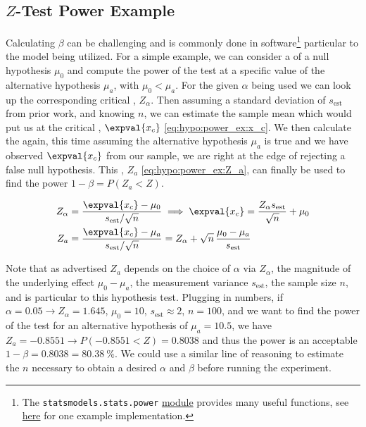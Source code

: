 \subsection{\texorpdfstring{$Z$}{Z}-Test Power Example}
\label{hypo:power:Z_example}

Calculating $\beta$ can be challenging and is commonly done in software\footnote{The \texttt{statsmodels.stats.power}
\href{https://www.statsmodels.org/stable/stats.html\#power-and-sample-size-calculations}{module}
provides many useful functions, see \href{https://machinelearningmastery.com/statistical-power-and-power-analysis-in-python/}{here} for one example implementation.} particular to the model being utilized.
For a simple example, we can consider a \Ztest of a null hypothesis $\mu_{0}$
and compute the power of the test at a specific value of the alternative hypothesis $\mu_{a}$, with $\mu_{0} < \mu_{a}$.
For the given $\alpha$ being used we can look up the corresponding critical \Zscore, $Z_{\alpha}$.
Then assuming a standard deviation of $s_{\text{est}}$ from prior work,
and knowing $n$, we can estimate the sample mean
which would put us at the critical \Zscore, $\expval{x_{c}}$ \cref{eq:hypo:power_ex:x_c}.
We then calculate the \Zscore again, this time assuming the alternative hypothesis $\mu_{a}$ is true
and we have observed $\expval{x_{c}}$ from our sample, \ie we are right at the edge of rejecting a false null hypothesis.
This \Zscore, $Z_{a}$ \cref{eq:hypo:power_ex:Z_a}, can finally be used to find the power $1-\beta = P\left(Z_{a} < Z\right)$.

\begin{subequations}\label{eq:hypo:power_ex}
\begin{align}
Z_{\alpha} &= \frac{\expval{x_{c}} - \mu_{0}}{s_{\text{est}} / \sqrt{n}} \implies
\expval{x_{c}} = \frac{Z_{\alpha} s_{\text{est}}}{\sqrt{n}} + \mu_{0} \label{eq:hypo:power_ex:x_c} \\
Z_{a} &= \frac{\expval{x_{c}} - \mu_{a}}{s_{\text{est}} / \sqrt{n}}
= Z_{\alpha} + \sqrt{n}\,\frac{\mu_{0} - \mu_{a}}{s_{\text{est}}} \label{eq:hypo:power_ex:Z_a}
\end{align}
\end{subequations}

Note that as advertised $Z_{a}$ depends on
the choice of $\alpha$ via $Z_{\alpha}$,
the magnitude of the underlying effect $\mu_{0} - \mu_{a}$,
the measurement variance $s_{\text{est}}$,
the sample size $n$,
and is particular to this hypothesis test.
Plugging in numbers, if
$\alpha = \num{0.05} \to Z_{\alpha} = \num{1.645}$,
$\mu_{0} = \num{10}$,
$s_{\text{est}} \approx \num{2}$,
$n = \num{100}$,
and we want to find the power of the test for an alternative hypothesis of $\mu_{a} = \num{10.5}$,
we have $Z_{a} = \num{-0.8551} \to P\left(\num{-0.8551} < Z\right) = \num{0.8038}$
and thus the power is an acceptable $1-\beta = \num{0.8038} = \SI{80.38}{\percent}$.
We could use a similar line of reasoning to estimate
the $n$ necessary to obtain a desired $\alpha$ and $\beta$ before running the experiment.

